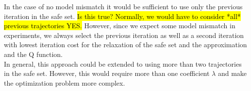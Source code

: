 In the case of no model mismatch it would be sufficient to use only the previous iteration in the safe set. \hl{Is this true? Normally, we would have to consider *all* previous trajectories YES.}
However, since we expect some model mismatch in experiments, we always select the previous iteration as well as a second iteration with lowest iteration cost for the relaxation of the safe set and the approximation and the Q function.\\
In general, this approach could be extended to using more than two trajectories in the safe set. However, this would require more than one coefficient $\lambda$ and make the optimization problem more complex.

